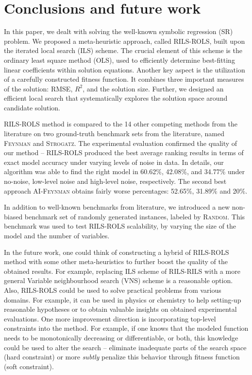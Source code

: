 \documentclass{bmcart}
\begin{document}
\section{Conclusions and future work}\label{sec:conclusions}

In this paper, we dealt with solving the well-known symbolic regression (SR)  problem.  
We proposed a meta-heuristic approach, called \textsc{RILS}-\textsc{ROLS}, built upon the iterated local search (ILS) scheme. The crucial element of this scheme is the ordinary least square method (OLS), used to efficiently determine best-fitting linear coefficients within solution equations. 
Another key aspect is the utilization of a carefully constructed fitness function. It combines three important measures of the solution: RMSE, $R^2$, and the solution size. 
Further, we designed an efficient local search that systematically explores the solution space around candidate solution.

\textsc{RILS-ROLS} method is compared to the 14 other competing methods from the literature on two ground-truth benchmark sets from the literature, named \textsc{Feynman} and \textsc{Strogatz}. The experimental evaluation confirmed the quality of our method -- \textsc{RILS-ROLS} produced the best average ranking results in terms of exact model accuracy under varying levels of noise in data. 
In details, our algorithm was able to find the right model in 60.62\%, 42.08\%, and 34.77\% under no-noise, low-level noise and high-level noise, respectively. The second best approach \textsc{AI-Feynman} obtains fairly worse percentages: 52.65\%, 31.89\% and 20\%. 

In addition to well-known benchmarks from literature, we introduced a new non-biased benchmark set of randomly generated instances, labeled by \textsc{Random}. 
This benchmark was used to test \textsc{RILS}-\textsc{ROLS} scalability, by varying the size of the model and the number of variables. 

In the future work, one could think of constructing a hybrid of \textsc{RILS-ROLS} method with some other meta-heuristics to further boost the quality of the obtained results. For example, replacing ILS scheme of \textsc{RILS-RILS} with a more general Variable neighbourhood search (VNS) scheme is a reasonable option. Also, \textsc{RILS-ROLS} could be used to solve practical problems from various domains. For example, it can be used in physics or chemistry to help setting-up reasonable hypotheses or to obtain valuable insights on obtained experimental evaluations. One more improvement direction is incorporating top-level constraints into the method. For example, if one knows that the modeled function needs to be monotonically decreasing or differentiable, or both, this knowledge could be used to alter the search -- eliminate inadequate parts of the search space (hard constraint) or more \emph{subtly} penalize this behavior through fitness function (soft constraint). 
\end{document}
